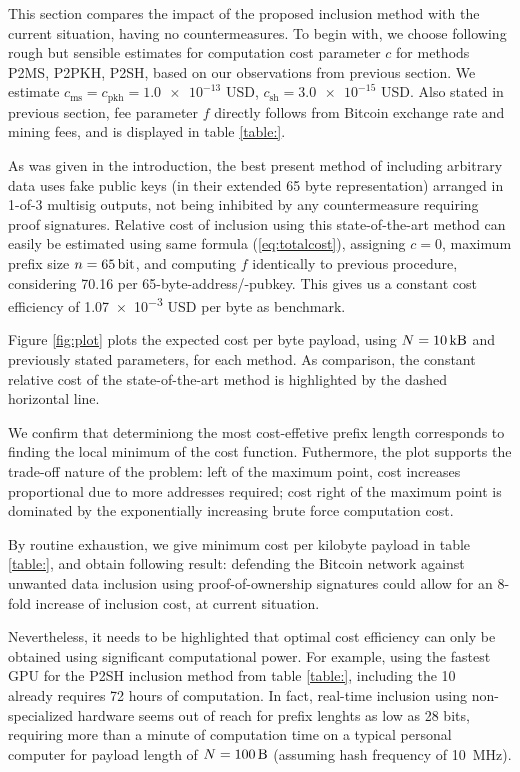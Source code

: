 \documentclass[10pt,a4paper,twocolumn]{article}
\begin{document}
This section compares the impact of the proposed inclusion method with the current situation, having no countermeasures.
To begin with, we choose following rough but sensible estimates for computation cost parameter $c$ for methods P2MS, P2PKH, P2SH, based on our observations from previous section.
We estimate $c_\text{ms}=c_\text{pkh}=\num{1.0e-13}$ USD, $c_\text{sh} = \num{3.0e-15}$ USD.
Also stated in previous section, fee parameter $f$ directly follows from Bitcoin exchange rate and mining fees, and is displayed in table \ref{table:}.

As was given in the introduction, the best present method of including arbitrary data uses fake public keys (in their extended 65 byte representation) arranged in 1-of-3 multisig outputs, not being inhibited by any countermeasure requiring proof signatures.
Relative cost of inclusion using this state-of-the-art method can easily be estimated using same formula (\ref{eq:totalcost}), assigning $c=0$, maximum prefix size $n=\SI{65}{\bit}$, and computing $f$ identically to previous procedure, considering \SI{70.16}{\byte} per 65-byte-address/-pubkey.
This gives us a constant cost efficiency of \num{1.07e-3} USD per byte as benchmark.

Figure \ref{fig:plot} plots the expected cost per byte payload, using $N=\SI{10}{\kilo\byte}$ and previously stated parameters, for each method.
As comparison, the constant relative cost of the state-of-the-art method is highlighted by the dashed horizontal line. 

We confirm that determiniong the most cost-effetive prefix length corresponds to finding the local minimum of the cost function.
Futhermore, the plot supports the trade-off nature of the problem: left of the maximum point, cost increases proportional due to more addresses required; cost right of the maximum point is dominated by the exponentially increasing brute force computation cost.

By routine exhaustion, we give minimum cost per kilobyte payload in table \ref{table:},
and obtain following result: 
defending the Bitcoin network against unwanted data inclusion using proof-of-ownership signatures could allow for an 8-fold increase of inclusion cost, at current situation.

Nevertheless, it needs to be highlighted that optimal cost efficiency can only be obtained using significant computational power.
For example, using the fastest GPU for the P2SH inclusion method from table \ref{table:}, including the \SI{10}{\kilo\byte} already requires 72 hours of computation.
In fact, real-time inclusion using non-specialized hardware seems out of reach for prefix lenghts as low as 28 bits, requiring more than a minute of computation time on a typical personal computer for payload length of $N=\SI{100}{\byte}$ (assuming hash frequency of \SI{10}{\mega\hertz}).
\end{document}
